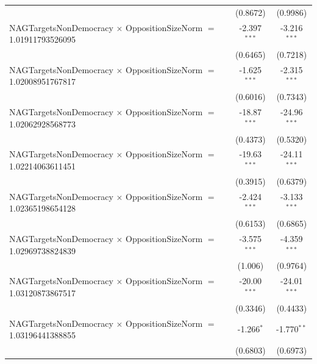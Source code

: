 \begin{tabular}{lcc}
                                                                                & (0.8672)             & (0.9986)\\   
   NAGTargetsNonDemocracy $\times$ OppositionSizeNorm $=$ 1.01911793526095      & -2.397$^{***}$       & -3.216$^{***}$\\   
                                                                                & (0.6465)             & (0.7218)\\   
   NAGTargetsNonDemocracy $\times$ OppositionSizeNorm $=$ 1.02008951767817      & -1.625$^{***}$       & -2.315$^{***}$\\   
                                                                                & (0.6016)             & (0.7343)\\   
   NAGTargetsNonDemocracy $\times$ OppositionSizeNorm $=$ 1.02062928568773      & -18.87$^{***}$       & -24.96$^{***}$\\   
                                                                                & (0.4373)             & (0.5320)\\   
   NAGTargetsNonDemocracy $\times$ OppositionSizeNorm $=$ 1.02214063611451      & -19.63$^{***}$       & -24.11$^{***}$\\   
                                                                                & (0.3915)             & (0.6379)\\   
   NAGTargetsNonDemocracy $\times$ OppositionSizeNorm $=$ 1.02365198654128      & -2.424$^{***}$       & -3.133$^{***}$\\   
                                                                                & (0.6153)             & (0.6865)\\   
   NAGTargetsNonDemocracy $\times$ OppositionSizeNorm $=$ 1.02969738824839      & -3.575$^{***}$       & -4.359$^{***}$\\   
                                                                                & (1.006)              & (0.9764)\\   
   NAGTargetsNonDemocracy $\times$ OppositionSizeNorm $=$ 1.03120873867517      & -20.00$^{***}$       & -24.01$^{***}$\\   
                                                                                & (0.3346)             & (0.4433)\\   
   NAGTargetsNonDemocracy $\times$ OppositionSizeNorm $=$ 1.03196441388855      & -1.266$^{*}$         & -1.770$^{**}$\\   
                                                                                & (0.6803)             & (0.6973)\\   

\end{tabular}
